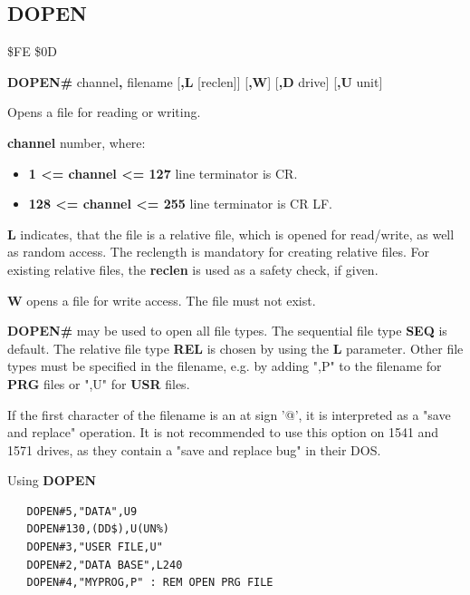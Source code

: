 \subsection{DOPEN}
\begin{description}[leftmargin=2cm,style=nextline]
\item [Token:] \$FE \$0D
\item [Format:] {\bf DOPEN\#} channel{\bf,} filename
		[{\bf,L} [reclen]] [{\bf,W}] [{\bf,D} drive] [{\bf,U} unit]
\item [Usage:]
    Opens a file for reading or writing.

    {\bf channel} number, where:
    \begin{itemize}
        \item {\bf 1 <= channel <= 127} line terminator is CR.
        \item {\bf 128 <= channel <= 255} line terminator is CR LF.
    \end{itemize}

   {\bf L} indicates, that the file is a relative file, which
   is opened for read/write, as well as random access. The reclength
   is mandatory for creating relative files. For existing
   relative files, the {\bf reclen} is used as a safety check, if given.

   {\bf W} opens a file for write access. The file must not exist.

   \filenamedefinition

   \drivedefinition

   \unitdefinition

\item [Remarks:]
   {\bf DOPEN\#} may be used to open all file types.
   The sequential file type {\bf SEQ} is default.
   The relative file type {\bf REL} is chosen by using the
   {\bf L} parameter.  Other file types
   must be specified in the filename, e.g. by adding ",P" to the
   filename for {\bf PRG} files or ",U" for {\bf USR} files.

   If the first character of the filename is an at sign '@', it
   is interpreted as a "save and replace" operation. It is not recommended
   to use this option on 1541 and 1571 drives, as they
   contain a "save and replace bug" in their DOS.

\newpage
\item [Examples:] Using {\bf DOPEN}

\begin{tcolorbox}[colback=black,coltext=white]
\verbatimfont{\codefont}
\begin{verbatim}
   DOPEN#5,"DATA",U9
   DOPEN#130,(DD$),U(UN%)
   DOPEN#3,"USER FILE,U"
   DOPEN#2,"DATA BASE",L240
   DOPEN#4,"MYPROG,P" : REM OPEN PRG FILE
\end{verbatim}
\end{tcolorbox}
\end{description}

